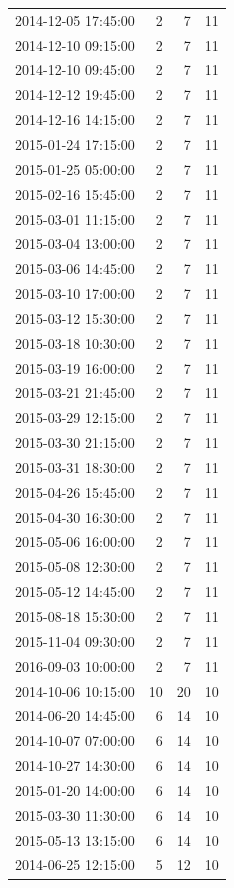 \begin{tabular}{lrrr}
2014-12-05 17:45:00 & 2 & 7 & 11 \\
2014-12-10 09:15:00 & 2 & 7 & 11 \\
2014-12-10 09:45:00 & 2 & 7 & 11 \\
2014-12-12 19:45:00 & 2 & 7 & 11 \\
2014-12-16 14:15:00 & 2 & 7 & 11 \\
2015-01-24 17:15:00 & 2 & 7 & 11 \\
2015-01-25 05:00:00 & 2 & 7 & 11 \\
2015-02-16 15:45:00 & 2 & 7 & 11 \\
2015-03-01 11:15:00 & 2 & 7 & 11 \\
2015-03-04 13:00:00 & 2 & 7 & 11 \\
2015-03-06 14:45:00 & 2 & 7 & 11 \\
2015-03-10 17:00:00 & 2 & 7 & 11 \\
2015-03-12 15:30:00 & 2 & 7 & 11 \\
2015-03-18 10:30:00 & 2 & 7 & 11 \\
2015-03-19 16:00:00 & 2 & 7 & 11 \\
2015-03-21 21:45:00 & 2 & 7 & 11 \\
2015-03-29 12:15:00 & 2 & 7 & 11 \\
2015-03-30 21:15:00 & 2 & 7 & 11 \\
2015-03-31 18:30:00 & 2 & 7 & 11 \\
2015-04-26 15:45:00 & 2 & 7 & 11 \\
2015-04-30 16:30:00 & 2 & 7 & 11 \\
2015-05-06 16:00:00 & 2 & 7 & 11 \\
2015-05-08 12:30:00 & 2 & 7 & 11 \\
2015-05-12 14:45:00 & 2 & 7 & 11 \\
2015-08-18 15:30:00 & 2 & 7 & 11 \\
2015-11-04 09:30:00 & 2 & 7 & 11 \\
2016-09-03 10:00:00 & 2 & 7 & 11 \\
2014-10-06 10:15:00 & 10 & 20 & 10 \\
2014-06-20 14:45:00 & 6 & 14 & 10 \\
2014-10-07 07:00:00 & 6 & 14 & 10 \\
2014-10-27 14:30:00 & 6 & 14 & 10 \\
2015-01-20 14:00:00 & 6 & 14 & 10 \\
2015-03-30 11:30:00 & 6 & 14 & 10 \\
2015-05-13 13:15:00 & 6 & 14 & 10 \\
2014-06-25 12:15:00 & 5 & 12 & 10 \\

\end{tabular}

